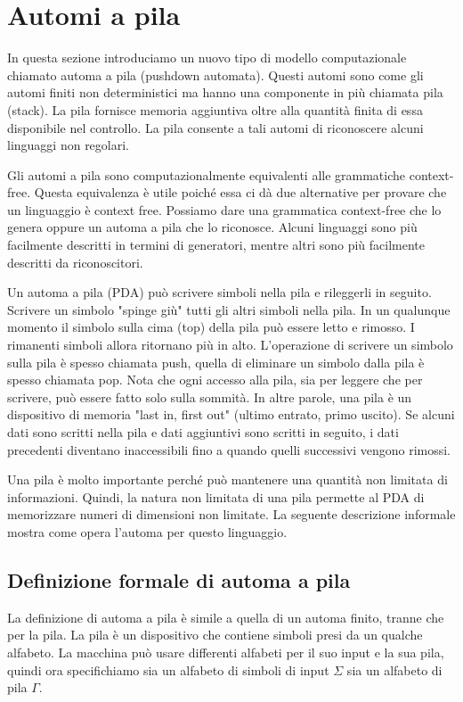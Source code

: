 \section{Automi a pila}
In questa sezione introduciamo un nuovo tipo di modello computazionale chiamato automa a pila (pushdown automata). Questi automi sono come gli automi finiti non deterministici ma hanno una componente in più chiamata pila (stack). La pila fornisce memoria aggiuntiva oltre alla quantità finita di essa disponibile nel controllo. La pila consente a tali automi di riconoscere alcuni linguaggi non regolari.

Gli automi a pila sono computazionalmente equivalenti alle grammatiche context-free. Questa equivalenza è utile poiché essa ci dà due alternative per provare che un linguaggio è context free. Possiamo dare una grammatica context-free che lo genera oppure un automa a pila che lo riconosce. Alcuni linguaggi sono più facilmente descritti in termini di generatori, mentre altri sono più facilmente descritti da riconoscitori.

Un automa a pila (PDA) può scrivere simboli nella pila e rileggerli in seguito. Scrivere un simbolo "spinge giù" tutti gli altri simboli nella pila. In un qualunque momento il simbolo sulla cima (top) della pila può essere letto e rimosso. I rimanenti simboli allora ritornano più in alto. L'operazione di scrivere un simbolo sulla pila è spesso chiamata push, quella di eliminare un simbolo dalla pila è spesso chiamata pop. Nota che ogni accesso alla pila, sia per leggere che per scrivere, può essere fatto solo sulla sommità. In altre parole, una pila è un dispositivo di memoria "last in, first out" (ultimo entrato, primo uscito). Se alcuni dati sono scritti nella pila e dati aggiuntivi sono scritti in seguito, i dati precedenti diventano inaccessibili fino a quando quelli successivi vengono rimossi.

Una pila è molto importante perché può mantenere una quantità non limitata di informazioni. Quindi, la natura non limitata di una pila permette al PDA di memorizzare numeri di dimensioni non limitate. La seguente descrizione informale mostra come opera l'automa per questo linguaggio.

\subsection{Definizione formale di automa a pila}
La definizione di automa a pila è simile a quella di un automa finito, tranne che per la pila. La pila è un dispositivo che contiene simboli presi da un qualche alfabeto. La macchina può usare differenti alfabeti per il suo input e la sua pila, quindi ora specifichiamo sia un alfabeto di simboli di input $\Sigma$ sia un alfabeto di pila $\Gamma$.

